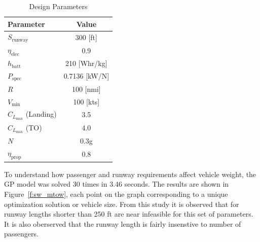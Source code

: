 \documentclass[]{aiaa-tc}%
\begin{document}
\begin{table}[H]
    \centering
    \caption{Design Parameters}
    \label{t:params}
    \begin{tabular}{l c}
    \toprule
    \toprule
    Parameter                                   & Value         \\ \hline
    $S_{\mathrm{runway}}$                       & 300 [ft]      \\
    $\eta_{\mathrm{elec}}$                      & 0.9           \\
    $h_{\mathrm{batt}}$                         & 210 [Whr/kg]  \\
    $P_{\mathrm{spec}}$                         & 0.7136 [kW/N] \\
    $R$                                         & 100 [nmi]     \\
    $V_{\mathrm{min}}$                          & 100 [kts]     \\
    $C_{L_{\mathrm{max}}}$ (Landing)            & 3.5           \\
    $C_{L_{\mathrm{max}}}$ (TO)                 & 4.0           \\
    $N$                                         & 0.3g          \\
    $\eta_{\mathrm{prop}}$                      & 0.8           \\
    \bottomrule
\end{tabular}
\end{table}

To understand how passenger and runway requirements affect vehicle weight, the GP model was solved 30 times in 3.46 seconds.  
The results are shown in Figure~\ref{f:sw_mtow}, each point on the graph corresponding to a unique optimization solution or vehicle size.  
From this study it is observed that for runway lengths shorter than 250 ft are near infeasible for this set of parameters.  
It is also oberserved that the runway length is fairly insenstive to number of passengers.  
\end{document}

